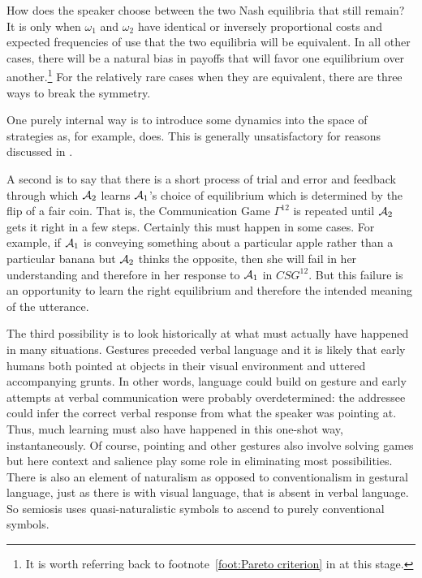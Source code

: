 How does the speaker choose between the two Nash equilibria that still remain? It is only when $\omega_1$ and $\omega_2$ have identical or inversely proportional costs and expected frequencies of use that the two equilibria will be equivalent. In all other cases, there will be a natural bias in payoffs that will favor one equilibrium over another.\footnote{It is worth referring back to footnote~\ref{foot:Pareto criterion} in  at this stage.} For the relatively rare cases when they are equivalent, there are three ways to break the symmetry. 

One purely internal way is to introduce some dynamics into the space of strategies as, for example, \citet{skyrms:s} does. This is generally unsatisfactory for reasons discussed in .

A second is to say that there is a short process of trial and error and feedback through which ${\cal A}_2$ learns ${\cal A}_1$'s choice of equilibrium which is determined by the flip of a fair coin. That is, the Communication Game $\Gamma^{12}$ is repeated until ${\cal A}_2$ gets it right in a few steps. Certainly this must happen in some cases. For example, if ${\cal A}_1$ is conveying something about a particular apple rather than a particular banana but ${\cal A}_2$ thinks the opposite, then she will fail in her understanding and therefore in her response to ${\cal A}_1$ in $CSG^{12}$. But this failure is an opportunity to learn the right equilibrium and therefore the intended meaning of the utterance.

The third possibility is to look historically at what must actually have happened in many situations. Gestures preceded verbal language and it is likely that early humans both pointed at objects in their visual environment and uttered accompanying grunts. In other words, language could build on gesture and early attempts at verbal communication were probably overdetermined: the addressee could infer the correct verbal response from what the speaker was pointing at. Thus, much learning must also have happened in this one-shot way, instantaneously. Of course, pointing and other gestures also involve solving games but here context and salience play some role in eliminating most possibilities. There is also an element of naturalism as opposed to conventionalism in gestural language, just as there is with visual language, that is absent in verbal language. So semiosis uses quasi-naturalistic symbols to ascend to purely conventional symbols.

